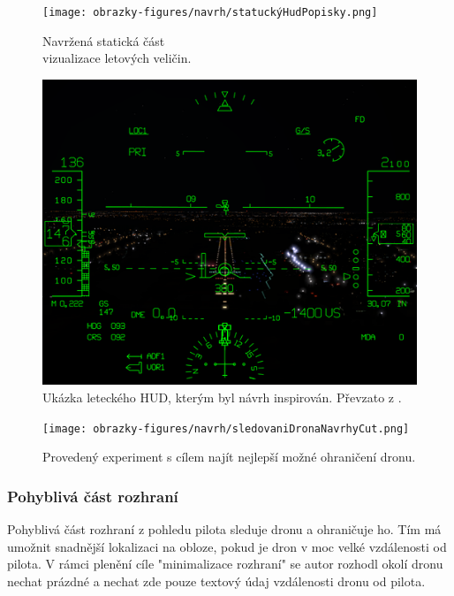 \begin{figure}[h]
  \begin{minipage}{0.45\textwidth}
    \centering
    \texttt{[image: obrazky-figures/navrh/statuckýHudPopisky.png]}
    \caption{Navržená statická část\\ vizualizace letových veličin.} 
    \label{pic:graphicHudNavrh}
  \end{minipage}
  \hfill
  \begin{minipage}{0.55\textwidth}
    \centering
    \includegraphics[width=\textwidth]{obrazky-figures/navrh/AT-HUD-Product-Tile.png}
    \caption{Ukázka leteckého HUD, kterým byl návrh inspirován.  Převzato z \cite{hudPic}.} 
    \label{pic:HUDdisplay}
  \end{minipage}
\end{figure}

\begin{figure}[H]
    \centering
    \texttt{[image: obrazky-figures/navrh/sledovaniDronaNavrhyCut.png]}
    \caption{Provedený experiment s cílem najít nejlepší možné ohraničení dronu.}
    \label{pic:experimentOhraniceni}
\end{figure}
\subsubsection{Pohyblivá část rozhraní}
Pohyblivá část rozhraní z pohledu pilota sleduje dronu a ohraničuje ho. Tím má umožnit snadnější lokalizaci na obloze, pokud je dron v moc velké vzdálenosti od pilota. V rámci plenění cíle "minimalizace rozhraní" se autor rozhodl okolí dronu nechat prázdné a nechat zde pouze textový údaj vzdálenosti dronu od pilota.

